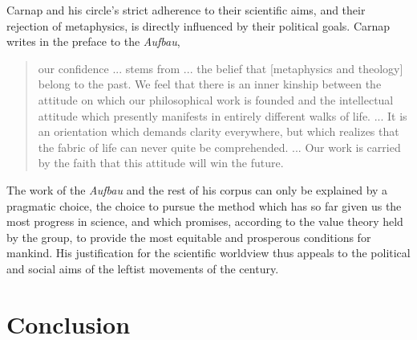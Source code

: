 \documentclass[leqno, 12pt]{turabian-researchpaper}
\begin{document}
	Carnap and his circle's strict adherence to their scientific aims, and their
	rejection of metaphysics, is directly influenced by their political goals.
	Carnap writes in the preface to the \textit{Aufbau}, \blockquote[{\cite[xvii-xviii]{carnap2003}}]{our confidence ... stems from ... the belief that [metaphysics and theology] belong to the past. We feel that there is an inner kinship between the attitude on which our philosophical work is founded and the intellectual attitude which presently manifests in entirely different walks of life. ... It is an orientation which demands clarity everywhere, but which realizes that the fabric of life can never quite be comprehended. ... Our work is carried by the faith that this attitude will win the future.}
	The work of the \textit{Aufbau} and the rest of his corpus can only be explained
	by a pragmatic choice, the choice to pursue the method which has so far given
	us the most progress in science, and which promises, according to the value
	theory held by the group, to provide the most equitable and prosperous conditions
	for mankind. His justification for the scientific worldview thus appeals to
	the political and social aims of the leftist movements of the  century.

	\section{Conclusion}

	\clearpage
	\printbibliography
\end{document}
